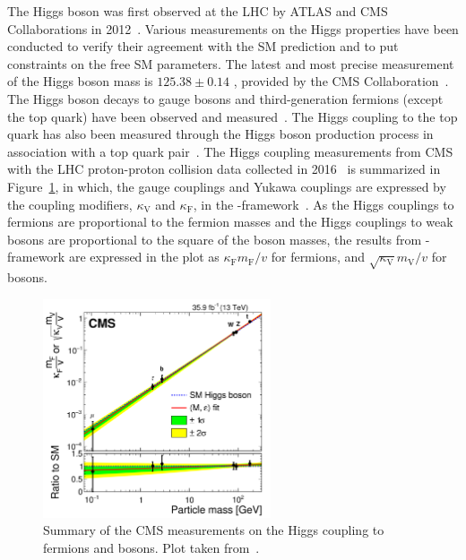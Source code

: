 The Higgs boson was first observed at the LHC by ATLAS and CMS Collaborations in 2012~\cite{Aad:2012tfa, Chatrchyan:2012xdj, Chatrchyan:2013lba}.
Various measurements on the Higgs properties have been conducted to verify their agreement with the SM prediction and to put constraints on the free SM parameters.
The latest and most precise measurement of the Higgs boson mass is $125.38 \pm 0.14$ \GeV, provided by the CMS Collaboration~\cite{2020135425}. 
The Higgs boson decays to gauge bosons and third-generation fermions (except the top quark) have been observed 
and measured~\cite{Sirunyan:2312121, 201996, Sirunyan:2017exp, PhysRevLett.121.121801, 2018283, PhysRevD.99.072001, 201859, 2019508, Aaboud_2018}.
The Higgs coupling to the top quark has also been measured through the Higgs boson production process in association with a top quark pair~\cite{PhysRevLett.120.231801, 2018173}.
The Higgs coupling measurements from CMS with the LHC proton-proton collision data collected in 2016~\cite{Sirunyan:2640611} is summarized in Figure~\ref{fig:higgs_2016},
in which, the gauge couplings and Yukawa couplings are expressed by the coupling modifiers,
$\kappa_{\text{V}}$ and $\kappa_{\text{F}}$, in the \kappa-framework~\cite{Heinemeyer:2013tqa}.
As the Higgs couplings to fermions are proportional to the fermion masses and the Higgs couplings to weak bosons are proportional to the square of the boson masses,
the results from \kappa-framework are expressed in the plot as $\kappa_{\text{F}}m_{\text{F}}/v$ for fermions, and $\sqrt{\kappa_{\text{V}}}m_{\text{V}}/v$ for bosons.

\begin{figure}[!htb]
  \centering
  \captionsetup{justification=justified}
  \includegraphics[width=0.60\textwidth]{pics/Intro/higgs_coupling_2016.png}
  \caption{Summary of the CMS measurements on the Higgs coupling to fermions and bosons.
           Plot taken from~\cite{Sirunyan:2640611}. }
  \label{fig:higgs_2016}
\end{figure}

